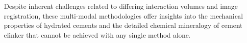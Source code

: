 Despite inherent challenges related to differing interaction volumes and image registration, these multi-modal methodologies offer insights into the mechanical properties of hydrated cements and the detailed chemical mineralogy of cement clinker that cannot be achieved with any single method alone.

